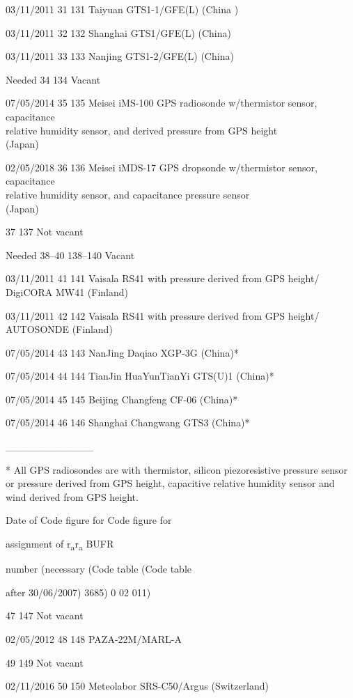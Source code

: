 03/11/2011 31 131 Taiyuan GTS1-1/GFE(L) (China )

03/11/2011 32 132 Shanghai GTS1/GFE(L) (China)

03/11/2011 33 133 Nanjing GTS1-2/GFE(L) (China)

Needed 34 134 Vacant

07/05/2014 35 135 Meisei iMS-100 GPS radiosonde w/thermistor sensor, capacitance\\
relative humidity sensor, and derived pressure from GPS height\\
(Japan)

02/05/2018 36 136 Meisei iMDS-17 GPS dropsonde w/thermistor sensor, capacitance\\
relative humidity sensor, and capacitance pressure sensor\\
(Japan)

37 137 Not vacant

Needed 38--40 138--140 Vacant

03/11/2011 41 141 Vaisala RS41 with pressure derived from GPS height/\\
DigiCORA MW41 (Finland)

03/11/2011 42 142 Vaisala RS41 with pressure derived from GPS height/\\
AUTOSONDE (Finland)

07/05/2014 43 143 NanJing Daqiao XGP-3G (China)*

07/05/2014 44 144 TianJin HuaYunTianYi GTS(U)1 (China)*

07/05/2014 45 145 Beijing Changfeng CF-06 (China)*

07/05/2014 46 146 Shanghai Changwang GTS3 (China)*

\_\_\_\_\_\_\_\_\_\_\_\_

* All GPS radiosondes are with thermistor, silicon piezoresistive pressure sensor or pressure derived from GPS height, capacitive relative humidity sensor and wind derived from GPS height.

Date of Code figure for Code figure for

assignment of r\textsubscript{a}r\textsubscript{a} BUFR

number (necessary (Code table (Code table

after 30/06/2007) 3685) 0 02 011)

47 147 Not vacant

02/05/2012 48 148 PAZA-22M/MARL-A

49 149 Not vacant

02/11/2016 50 150 Meteolabor SRS-C50/Argus (Switzerland)

